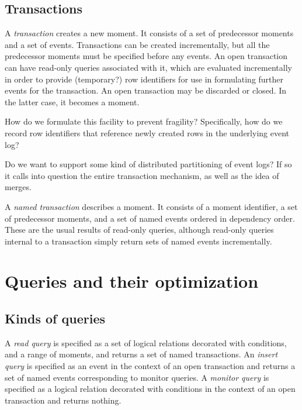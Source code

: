 \documentclass{article}
\begin{document}
\subsection{Transactions}
\label{transactions}

A \emph{transaction} creates a new moment.  It consists of a set of predecessor moments and a set of events.  Transactions can be created incrementally, but all the predecessor moments must be specified before any events.  An open transaction can have read-only queries associated with it, which are evaluated incrementally in order to provide (temporary?) row identifiers for use in formulating further events for the transaction.  An open transaction may be discarded or closed.  In the latter case, it becomes a moment.

\begin{question}
	How do we formulate this facility to prevent fragility?  Specifically, how do we record row identifiers that reference newly created rows in the underlying event log?
\end{question}

\begin{question}
	Do we want to support some kind of distributed partitioning of event logs?  If so it calls into question the entire transaction mechanism, as well as the idea of merges.
\end{question}

A \emph{named transaction} describes a moment.  It consists of a moment identifier, a set of predecessor moments, and a set of named events ordered in dependency order.  These are the usual results of read-only queries, although read-only queries internal to a transaction simply return sets of named events incrementally.

\section{Queries and their optimization}

\subsection{Kinds of queries}
\label{queries}

A \emph{read query} is specified as a set of logical relations decorated with conditions, and a range of moments, and returns a set of named transactions.  An \emph{insert query} is specified as an event in the context of an open transaction and returns a set of named events corresponding to monitor queries.  A \emph{monitor query} is specified as a logical relation decorated with conditions in the context of an open transaction and returns nothing.
\end{document}

